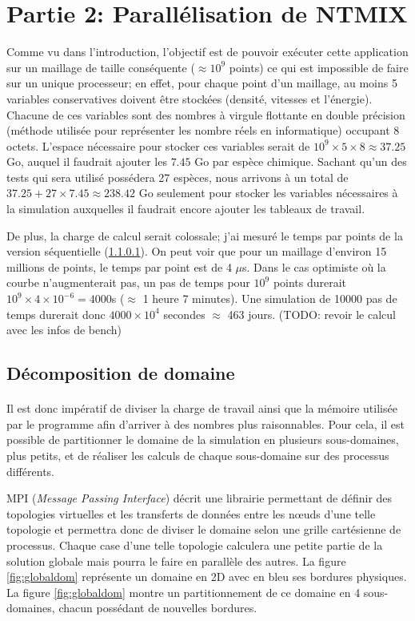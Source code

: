 \section{Partie 2: Parallélisation de NTMIX}


Comme vu dans l'introduction, l'objectif est de pouvoir exécuter cette application sur un maillage de taille conséquente ($\approx 10^9$ points) ce qui est impossible de faire sur un unique processeur; en effet, pour chaque point d'un maillage, au moins 5 variables conservatives doivent être stockées (densité, vitesses et l'énergie). Chacune de ces variables sont des nombres à virgule flottante en double précision (méthode utilisée pour représenter les nombre réels en informatique) occupant 8 octets. L'espace nécessaire pour stocker ces variables serait de $10^9 \times 5 \times 8 \approx 37.25$ Go, auquel il faudrait ajouter les $7.45$ Go par espèce chimique. Sachant qu'un des tests qui sera utilisé possédera 27 espèces, nous arrivons à un total de $37.25+27 \times 7.45\approx 238.42$ Go seulement pour stocker les variables nécessaires à la simulation auxquelles il faudrait encore ajouter les tableaux de travail.

De plus, la charge de calcul serait colossale; j'ai mesuré le temps par points de la version séquentielle (\ref{}). On peut voir que pour un maillage d'environ 15 millions de points, le temps par point est de 4 $\mu$s. Dans le cas optimiste où la courbe n'augmenterait pas, un pas de temps pour $10^9$ points durerait $10^9\times4\times10^{-6}=4000$s ($\approx$ 1 heure 7 minutes). Une simulation de 10000 pas de temps durerait donc $4000\times10^4$ secondes $\approx$ 463 jours. (TODO: revoir le calcul avec les infos de bench)

\subsection{Décomposition de domaine}
\paragraph{}Il est donc impératif de diviser la charge de travail ainsi que la mémoire utilisée par le programme afin d'arriver à des nombres plus raisonnables. Pour cela, il est possible de partitionner le domaine de la simulation en plusieurs sous-domaines, plus petits, et de réaliser les calculs de chaque sous-domaine sur des processus différents.

MPI (\textit{Message Passing Interface}) décrit une librairie permettant de définir des topologies virtuelles et les transferts de données entre les nœuds d'une telle topologie et permettra donc de diviser le domaine selon une grille cartésienne de processus. Chaque case d'une telle topologie calculera une petite partie de la solution globale mais pourra le faire en parallèle des autres. La figure \ref{fig:globaldom} représente un domaine en 2D avec en bleu ses bordures physiques. La figure \ref{fig:globaldom} montre un partitionnement de ce domaine en 4 sous-domaines, chacun possédant de nouvelles bordures.

